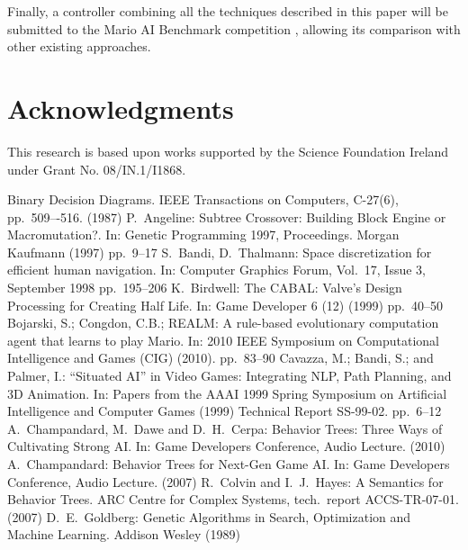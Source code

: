 \documentclass[conference]{IEEEtran}
\begin{document}
Finally, a controller combining all the techniques described in this paper will
be submitted to the Mario AI Benchmark competition \cite{JSR10}, allowing its
comparison with other existing approaches.

\section*{Acknowledgments}
This research is based upon works supported by the Science Foundation Ireland
under Grant No. 08/IN.1/I1868.


%
\begin{thebibliography}{11}
	Binary Decision Diagrams.
	IEEE Transactions on Computers, C-27(6), pp.~509–-516. (1987)
	P.~Angeline:
	Subtree Crossover: Building Block Engine or Macromutation?.
	In: Genetic Programming 1997, Proceedings.
	Morgan Kaufmann (1997)
	pp.~9--17
	S.~Bandi, D.~Thalmann:
	Space discretization for efficient human navigation.
	In: Computer Graphics Forum, Vol.~17, Issue 3, September 1998
	pp.~195--206
	K.~Birdwell:
	The CABAL: Valve's Design Processing for Creating Half Life.
	In: Game Developer 6 (12) (1999)
	pp.~40--50
	Bojarski, S.;   Congdon, C.B.;
	REALM: A rule-based evolutionary computation agent that learns to play Mario.
	In: 2010 IEEE Symposium on Computational Intelligence and Games (CIG) (2010).
	pp.~83--90
	Cavazza, M.; Bandi, S.; and Palmer, I.:
	“Situated AI” in Video Games: Integrating NLP, Path Planning, 
	and 3D Animation.
	In:  Papers from the AAAI 1999 Spring Symposium on Artificial 
	Intelligence and Computer Games (1999)
	Technical Report SS-99-02.
	pp.~6--12
	A.~Champandard, M.~Dawe and D.~H.~Cerpa:
	Behavior Trees: Three Ways of Cultivating Strong AI.
	In: Game Developers Conference, Audio Lecture. (2010)
	A.~Champandard:
	Behavior Trees for Next-Gen Game AI.
	In: Game Developers Conference, Audio Lecture. (2007)
	R.~Colvin and I.~J.~Hayes:
	A Semantics for Behavior Trees.
	ARC Centre for Complex Systems, tech.~report ACCS-TR-07-01. (2007)
	D.~E.~Goldberg:
	Genetic Algorithms in Search, Optimization and Machine Learning.
	Addison Wesley (1989)

\end{thebibliography}
\end{document}
